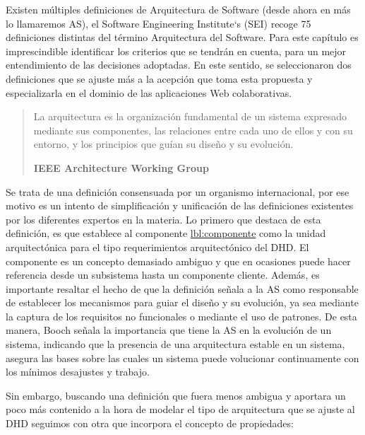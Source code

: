 Existen múltiples definiciones de Arquitectura de Software (desde ahora en más lo llamaremos AS), el Software Engineering Institute‘s (SEI)\cite{arquitectura23} recoge 75 definiciones distintas del término Arquitectura del Software. Para este capítulo es imprescindible identificar los criterios que se tendrán en cuenta, para un mejor entendimiento de las decisiones adoptadas. En este sentido, se seleccionaron dos definiciones que se ajuste más a la acepción que toma esta propuesta y especializarla en el dominio de las aplicaciones Web colaborativas.

\begin{quote}

La arquitectura es la organización fundamental de un sistema
expresado mediante sus componentes, las relaciones entre cada uno de ellos y
con su entorno, y los principios que guían su diseño y su evolución.

\begin{flushright} \textbf{IEEE Architecture Working Group} \end{flushright}

\end{quote}

Se trata de una definición consensuada por un organismo internacional, por ese motivo es un intento de simplificación y unificación de las definiciones existentes por los diferentes expertos en la materia. Lo primero que destaca de esta definición, es que establece al componente \hyperref[componente]{lbl:componente} como la unidad arquitectónica para el tipo requerimientos arquitectónico del DHD. El componente es un concepto demasiado ambiguo y que en ocasiones puede hacer referencia desde un subsistema hasta un componente cliente. Además, es importante resaltar el hecho de que la definición señala a la AS como responsable de establecer los mecanismos para guiar el diseño y su evolución, ya sea mediante la captura de los requisitos no funcionales o mediante el uso de patrones. De esta manera, Booch \cite{Booch15} señala la importancia que tiene la AS en la evolución de un sistema, indicando que
la presencia de una arquitectura estable en un sistema, asegura las bases sobre las cuales un sistema puede 
volucionar continuamente con los mínimos desajustes y trabajo.

Sin embargo, buscando una definición que fuera menos ambigua y aportara un poco más contenido a la hora de modelar el tipo de arquitectura que se ajuste al DHD seguimos con otra que incorpora el concepto de propiedades:

